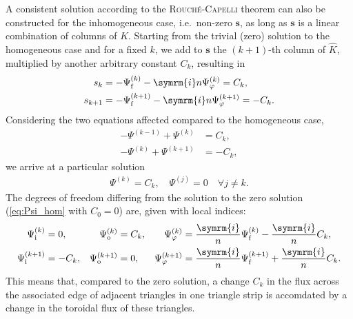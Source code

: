 \documentclass[a4paper, twoside, 10pt, english]{article}
\numberwithin{equation}{section}
\let\temp\varrho
\let\varrho\rho
\let\rho\temp
\let\temp\vartheta
\let\vartheta\theta
\let\theta\temp
\let\temp\varphi
\let\varphi\phi
\let\phi\temp
\let\vec\symbf
\newcommand*\im{\ensuremath{\symrm{i}}}  %
\newcommand*\fs{\ensuremath{\textrm{f}}}  %
\newcommand*\inw{\ensuremath{\textrm{i}}}  %
\newcommand*\out{\ensuremath{\textrm{o}}}  %
\begin{document}
A consistent solution according to the \textsc{Rouché}-\textsc{Capelli} theorem can also be constructed for the inhomogeneous case, i.e.\ non-zero $\vec{s}$, as long as $\vec{s}$ is a linear combination of columns of $K$. Starting from the trivial (zero) solution to the homogeneous case and for a fixed $k$, we add to $\vec{s}$ the $(k+1)$-th column of $\hat{K}$, multiplied by another arbitrary constant $C_{k}$, resulting in
\begin{align}
  s_{k} &= -\Psi_{\fs}^{(k)} - \im n \Psi_{\phi}^{(k)} = C_{k}, \\
  s_{k+1} &= -\Psi_{\fs}^{(k+1)} - \im n \Psi_{\phi}^{(k+1)} = -C_{k}.
\end{align}
Considering the two equations affected compared to the homogeneous case,
\begin{align}
  -\Psi^{(k-1)} + \Psi^{(k)} &= C_{k}, \\
  -\Psi^{(k)} + \Psi^{(k+1)} &= -C_{k},
\end{align}
we arrive at a particular solution
\begin{gather}
  \Psi^{(k)} = C_{k}, \quad \Psi^{(j)} = 0 \quad \forall j \neq k.
\end{gather}
The degrees of freedom differing from the solution to the zero solution (\cref{eq:Psi_hom} with $C_{0} = 0$) are, given with local indices:
\begin{align}
  \Psi_{\inw}^{(k)} &= 0, & \Psi_{\out}^{(k)} &= C_{k}, & \Psi_{\phi}^{(k)} &= \frac{\im}{n} \Psi_{\fs}^{(k)} - \frac{\im}{n} C_{k}, \\
  \Psi_{\inw}^{(k+1)} &= -C_{k}, & \Psi_{\out}^{(k+1)} &= 0, & \Psi_{\phi}^{(k+1)} &= \frac{\im}{n} \Psi_{\fs}^{(k+1)} + \frac{\im}{n} C_{k}.
\end{align}
This means that, compared to the zero solution, a change $C_{k}$ in the flux across the associated edge of adjacent triangles in one triangle strip is accomdated by a change in the toroidal flux of these triangles.
\end{document}
